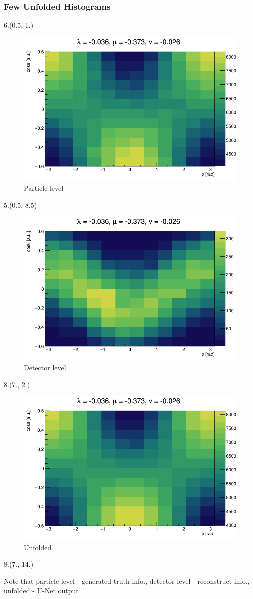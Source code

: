\documentclass[12pt, xcolor={dvipsnames}, aspectratio = 169, sans, mathserif]{beamer}
\newenvironment{Pic}[2]
{\begin{textblock}{#1}#2
\begin{figure}}
{\end{figure}
\end{textblock}}
\begin{document}
\begin{frame}
\frametitle{Few Unfolded Histograms}

\begin{Pic}{6.}{(0.5, 1.)}
  \caption{Particle level}
  \includegraphics[width=6.cm]{imgs/true_fit_1.png}
\end{Pic}

\begin{Pic}{5.}{(0.5, 8.5)}
  \caption{Detector level}
  \includegraphics[width=5.cm]{imgs/reco_fit_1.png}
\end{Pic}

\begin{Pic}{8.}{(7., 2.)}
  \caption{Unfolded}
  \includegraphics[width=8.cm]{imgs/pred_fit_1.png}
\end{Pic}

\begin{textblock}{8.}(7., 14.)
\begin{scriptsize}
Note that particle level - generated truth info., detector level - reconstruct info., unfolded - U-Net output
\end{scriptsize}
\end{textblock}

\end{frame}
\end{document}
